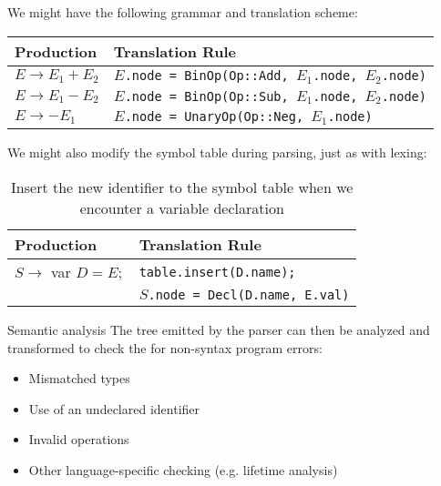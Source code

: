 \documentclass[../index.tex]{subfiles}
\begin{document}
\begin{frame}[fragile]{\currenttitle}
  We might have the following grammar and translation scheme: \\[1em]

  \begin{tabular}{l |l}
    Production & Translation Rule \\
    \hline
    $E \rightarrow E_1 + E_2$   & \texttt{$E$.node = BinOp(Op::Add, $E_1$.node, $E_2$.node)} \\
    $E \rightarrow E_1 - E_2$   & \texttt{$E$.node = BinOp(Op::Sub, $E_1$.node, $E_2$.node)} \\
    $E \rightarrow {-E_1}$      & \texttt{$E$.node = UnaryOp(Op::Neg, $E_1$.node)} \\
  \end{tabular}
\end{frame}

\begin{frame}[fragile]{\currenttitle}
  We might also modify the symbol table during parsing, just as with lexing:
  \\[1.5em]

  \begin{table}
    \centering
    \begin{tabular}{l |l}
      Production                    & Translation Rule \\
      \hline
      $S \rightarrow$ var $D = E ;$ & \texttt{table.insert(D.name);} \\
                                    & \texttt{$S$.node = Decl(D.name, E.val)}
    \end{tabular}
    \caption{Insert the new identifier to the symbol table when we encounter a
    variable declaration}
  \end{table}
\end{frame}
  
\renewcommand{\sectiontitle}{Semantic analysis}
\renewcommand{\currenttitle}{\sectiontitle}
\begin{frame}[fragile]{\currenttitle}
  The tree emitted by the parser can then be analyzed and transformed to check
  the for non-syntax program errors:

  \begin{itemize}
    \item Mismatched types
    \item Use of an undeclared identifier
    \item Invalid operations
    \item Other language-specific checking (e.g. lifetime analysis)
  \end{itemize}
\end{frame}
  
\end{document}
